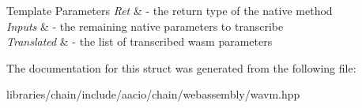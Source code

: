 \begin{DoxyTemplParams}{Template Parameters}
{\em Ret} & -\/ the return type of the native method \\
\hline
{\em Inputs} & -\/ the remaining native parameters to transcribe \\
\hline
{\em Translated} & -\/ the list of transcribed wasm parameters \\
\hline
\end{DoxyTemplParams}


The documentation for this struct was generated from the following file\+:\begin{DoxyCompactItemize}
\item 
libraries/chain/include/aacio/chain/webassembly/wavm.\+hpp\end{DoxyCompactItemize}
